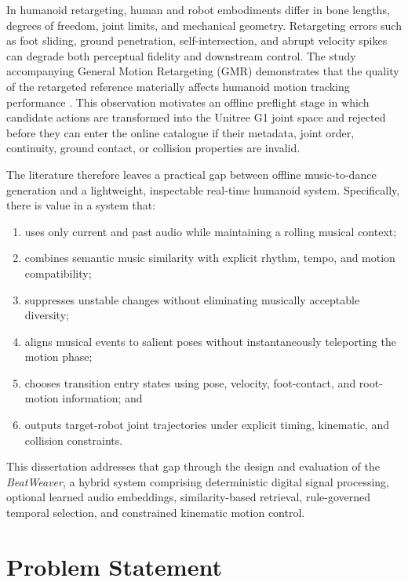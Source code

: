 In humanoid retargeting, human and robot embodiments differ in bone lengths,
degrees of freedom, joint limits, and mechanical geometry. Retargeting errors
such as foot sliding, ground penetration, self-intersection, and abrupt
velocity spikes can degrade both perceptual fidelity and downstream control.
The study accompanying General Motion Retargeting (GMR) demonstrates that the
quality of the retargeted reference materially affects humanoid motion tracking
performance \cite{araujo2025retargeting}. This observation motivates an offline
preflight stage in which candidate actions are transformed into the Unitree G1
joint space and rejected before they can enter the online catalogue if their
metadata, joint order, continuity, ground contact, or collision properties are
invalid.

The literature therefore leaves a practical gap between offline
music-to-dance generation and a lightweight, inspectable real-time humanoid
system. Specifically, there is value in a system that:

\begin{enumerate}
    \item uses only current and past audio while maintaining a rolling musical
          context;
    \item combines semantic music similarity with explicit rhythm, tempo, and
          motion compatibility;
    \item suppresses unstable changes without eliminating musically acceptable
          diversity;
    \item aligns musical events to salient poses without instantaneously
          teleporting the motion phase;
    \item chooses transition entry states using pose, velocity, foot-contact,
          and root-motion information; and
    \item outputs target-robot joint trajectories under explicit timing,
          kinematic, and collision constraints.
\end{enumerate}

This dissertation addresses that gap through the design and evaluation of the
\emph{BeatWeaver}, a hybrid system comprising deterministic digital
signal processing, optional learned audio embeddings, similarity-based
retrieval, rule-governed temporal selection, and constrained kinematic motion
control.

\section{Problem Statement}
\label{sec:intro_problem}

